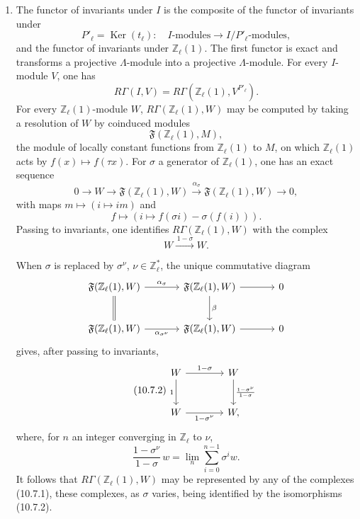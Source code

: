 \documentclass[10pt]{article}
\newcommand{\Z}{\mathbb Z}
\providecommand{\Ker}{\operatorname{Ker}}
\providecommand{\Ker}{\operatorname{Ker}}
\begin{document}
\begin{enumerate}[label=(\alph*)]
\item The functor of invariants under \(I\) is the composite of the functor of invariants under
\[
P'_\ell=\Ker(t_\ell):
\quad I\text{-modules}\longrightarrow I/P'_\ell\text{-modules},
\]
and the functor of invariants under \(\Z_\ell(1)\). The first functor is exact and transforms a projective \(\Lambda\)-module into a projective \(\Lambda\)-module. For every \(I\)-module \(V\), one has
\[
R\Gamma(I,V)=R\Gamma(\Z_\ell(1),V^{P'_\ell}).
\]
For every \(\Z_\ell(1)\)-module \(W\), \(R\Gamma(\Z_\ell(1),W)\) may be computed by taking a resolution of \(W\) by coinduced modules
\[
\mathfrak F(\Z_\ell(1),M),
\]
the module of locally constant functions from \(\Z_\ell(1)\) to \(M\), on which \(\Z_\ell(1)\) acts by \(f(x)\mapsto f(\tau x)\). For \(\sigma\) a generator of \(\Z_\ell(1)\), one has an exact sequence
\[
0\longrightarrow W\longrightarrow\mathfrak F(\Z_\ell(1),W)
\xrightarrow{\alpha_\sigma}
\mathfrak F(\Z_\ell(1),W)\longrightarrow0,
\]
with maps \(m\mapsto(i\mapsto im)\) and
\[
f\longmapsto(i\mapsto f(\sigma i)-\sigma(f(i))).
\]
Passing to invariants, one identifies \(R\Gamma(\Z_\ell(1),W)\) with the complex
\[
\tag{10.7.1}
W\xrightarrow{\,1-\sigma\,}W.
\]

When \(\sigma\) is replaced by \(\sigma^\nu\), \(\nu\in\Z_\ell^*\), the unique commutative diagram
\[
\begin{tikzcd}[column sep=3.5em,row sep=2.5em]
\mathfrak F(\Z_\ell(1),W)\arrow[r,"\alpha_\sigma"]\arrow[d,equal] &
\mathfrak F(\Z_\ell(1),W)\arrow[r]\arrow[d,"\beta"]&0\\
\mathfrak F(\Z_\ell(1),W)\arrow[r,"\alpha_{\sigma^\nu}"']&
\mathfrak F(\Z_\ell(1),W)\arrow[r]&0
\end{tikzcd}
\]
gives, after passing to invariants,
\[
\tag{10.7.2}
\begin{tikzcd}[column sep=3.8em,row sep=2.6em]
W\arrow[r,"1-\sigma"]\arrow[d,"1"']&
W\arrow[d,"\frac{1-\sigma^\nu}{1-\sigma}"]\\
W\arrow[r,"1-\sigma^\nu"']&W ,
\end{tikzcd}
\]
where, for \(n\) an integer converging in \(\Z_\ell\) to \(\nu\),
\[
\tag{10.7.3}
\frac{1-\sigma^\nu}{1-\sigma}\,w
=
\lim_n\sum_{i=0}^{n-1}\sigma^iw.
\]
It follows that \(R\Gamma(\Z_\ell(1),W)\) may be represented by any of the complexes (10.7.1), these complexes, as \(\sigma\) varies, being identified by the isomorphisms (10.7.2).


\end{enumerate}
\end{document}
